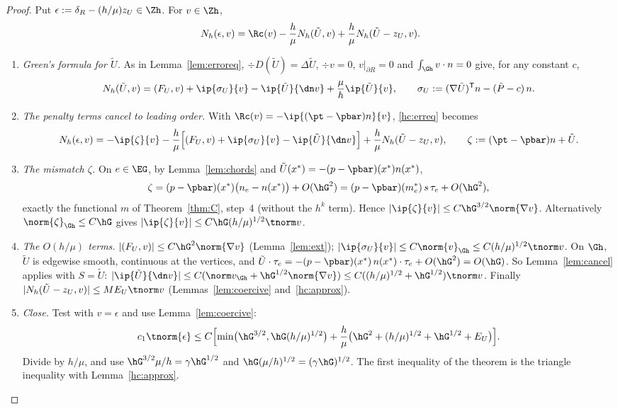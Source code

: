 \begin{proof}
Put $\epsilon:=\delta_R-(h/\mu)z_U\in\Zh$. For $v\in\Zh$,
\begin{equation}\label{hc:erreq}
N_h(\epsilon,v)=\Rc(v)-\frac h\mu N_h(\tilde U,v)+\frac h\mu N_h(\tilde U-z_U,v).
\end{equation}
\begin{enumerate}
\item \emph{Green's formula for $\tilde U$.} As in Lemma~\ref{lem:erroreq}, $\div D(\tilde U)=\Delta\tilde U$, $\div v=0$, $v|_{\partial R}=0$ and
$\int_{\Gh}v\cdot n=0$ give, for any constant $c$,
\[
N_h(\tilde U,v)=(F_U,v)+\ip{\sigma_U}{v}-\ip{\tilde U}{\dn v}+\frac\mu h\ip{\tilde U}{v},\qquad
\sigma_U:=(\nabla\tilde U)^{\mathsf T}n-(\tilde P-c)\,n .
\]
\item \emph{The penalty terms cancel to leading order.} With $\Rc(v)=-\ip{(\pt-\pbar)n}{v}$, \eqref{hc:erreq} becomes
\[
N_h(\epsilon,v)=-\ip{\zeta}{v}-\frac h\mu\Bigl[(F_U,v)+\ip{\sigma_U}{v}-\ip{\tilde U}{\dn v}\Bigr]+\frac h\mu N_h(\tilde U-z_U,v),
\qquad \zeta:=(\pt-\pbar)n+\tilde U .
\]
\item \emph{The mismatch $\zeta$.} On $e\in\EG$, by Lemma~\ref{lem:chords} and $\tilde U(x^\ast)=-(p-\pbar)(x^\ast)n(x^\ast)$,
\[
\zeta=(p-\pbar)(x^\ast)\bigl(n_e-n(x^\ast)\bigr)+O(\hG^2)=(p-\pbar)(m_e^\ast)\,s\,\tau_e+O(\hG^2),
\]
exactly the functional $m$ of Theorem~\ref{thm:C}, step~4 (without the $h^k$ term). Hence
$|\ip{\zeta}{v}|\le C\hG^{3/2}\norm{\nabla v}$. Alternatively $\norm{\zeta}_{\Gh}\le C\hG$ gives
$|\ip{\zeta}{v}|\le C\hG(h/\mu)^{1/2}\tnorm v$.
\item \emph{The $O(h/\mu)$ terms.} $|(F_U,v)|\le C\hG^2\norm{\nabla v}$ (Lemma~\ref{lem:ext}); $|\ip{\sigma_U}{v}|\le
C\norm{v}_{\Gh}\le C(h/\mu)^{1/2}\tnorm v$. On $\Gh$, $\tilde U$ is edgewise smooth, continuous at the vertices, and
$\tilde U\cdot\tau_e=-(p-\pbar)(x^\ast)\,n(x^\ast)\cdot\tau_e+O(\hG^2)=O(\hG)$. So Lemma~\ref{lem:cancel} applies with
$S=\tilde U$: $|\ip{\tilde U}{\dn v}|\le C(\norm v_{\Gh}+\hG^{1/2}\norm{\nabla v})\le C((h/\mu)^{1/2}+\hG^{1/2})\tnorm v$.
Finally $|N_h(\tilde U-z_U,v)|\le ME_U\tnorm v$ (Lemmas~\ref{lem:coercive} and~\ref{hc:approx}).
\item \emph{Close.} Test with $v=\epsilon$ and use Lemma~\ref{lem:coercive}:
\[
c_1\tnorm{\epsilon}\le C\Bigl[\min\bigl(\hG^{3/2},\hG(h/\mu)^{1/2}\bigr)+\frac h\mu\bigl(\hG^2+(h/\mu)^{1/2}+\hG^{1/2}+E_U\bigr)\Bigr].
\]
Divide by $h/\mu$, and use $\hG^{3/2}\mu/h=\gamma\hG^{1/2}$ and $\hG(\mu/h)^{1/2}=(\gamma\hG)^{1/2}$. The first inequality of the
theorem is the triangle inequality with Lemma~\ref{hc:approx}.\qedhere
\end{enumerate}
\end{proof}

